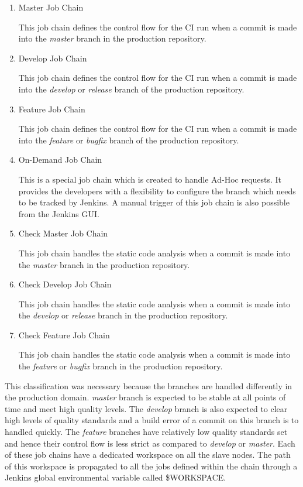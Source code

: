 \documentclass[12pt, a4paper, titlepage]{scrartcl}
\newcommand{\courierword}[1]{\textsf{\itshape #1}}{\fontfamily{pcr}\selectfont}%
\begin{document}
\begin{enumerate}
\item Master Job Chain
\par This job chain defines the control flow for the CI run when a commit is made into the \courierword{master} branch in the production repository.
\item Develop Job Chain
\par This job chain defines the control flow for the CI run when a commit is made into the \courierword{develop} or \courierword{release} branch of the production repository.
\item Feature Job Chain
\par This job chain defines the control flow for the CI run when a commit is made into the \courierword{feature} or \courierword{bugfix} branch of the production repository.
\item On-Demand Job Chain
\par This is a special job chain which is created to handle Ad-Hoc requests. It provides the developers with a flexibility to configure the branch which needs to be tracked by Jenkins. A manual trigger of this job chain is also possible from the Jenkins GUI.
\item Check Master Job Chain
\par This job chain handles the static code analysis when a commit is made into the \courierword{master} branch in the production repository.
\item Check Develop Job Chain
\par This job chain handles the static code analysis when a commit is made into the \courierword{develop} or \courierword{release} branch in the production repository.
\item Check Feature Job Chain
\par This job chain handles the static code analysis when a commit is made into the \courierword{feature} or \courierword{bugfix} branch in the production repository.
\end{enumerate}
\par This classification was necessary because the branches are handled differently in the production domain. \courierword{master} branch is expected to be stable at all points of time and meet high quality levels. The \courierword{develop} branch is also expected to clear high levels of quality standards and a build error of a commit on this branch is to handled quickly. The \courierword{feature} branches have relatively low quality standards set and hence their control flow is less strict as compared to \courierword{develop} or \courierword{master}. Each of these job chains have a dedicated workspace on all the slave nodes. The path of this workspace is propagated to all the jobs defined within the chain through a Jenkins global environmental variable called \$WORKSPACE. 
\end{document}
